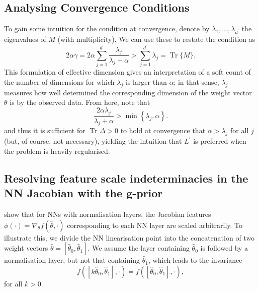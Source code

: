 \subsection{Analysing Convergence Conditions}
\label{app:large_regulariser_derivation}

To gain some intuition for the condition at convergence, denote by $\lambda_1, \ldots, \lambda_{d^{\prime}}$ the eigenvalues of $M$ (with multiplicity). We can use these to restate the condition as
\begin{equation}
    2 \alpha \gamma=2 \alpha \sum_{j=1}^{d^{\prime}} \frac{\lambda_j}{\lambda_j+\alpha}>\sum_{j=1}^{d^{\prime}} \lambda_j=\operatorname{Tr}\{M\}.
\end{equation}
This formulation of effective dimension gives an interpretation of a soft count of the number of dimensions for which $\lambda_j$ is larger than $\alpha$; in that sense, $\lambda_j$ measures how well determined the corresponding dimension of the weight vector $\theta$ is by the observed data. From here, note that
\begin{equation}
    \frac{2 \alpha \lambda_j}{\lambda_j+\alpha}>\min \left\{\lambda_j, \alpha\right\}.
\end{equation}
and thus it is sufficient for $\operatorname{Tr} \Delta>0$ to hold at convergence that $\alpha>\lambda_j$ for all $j$ (but, of course, not necessary), yielding the intuition that $L^{\prime}$ is preferred when the problem is heavily regularised.

\subsection{Resolving feature scale indeterminacies in the NN Jacobian with the g-prior}\label{app:g-prior-scale-solution}

\textcite{antoran2022linearised} show that for NNs with normalisation layers, the Jacobian features $\phi(\cdot) = \nabla_{\theta}f(\hat{\theta}, \cdot)$ corresponding to each NN layer are scaled arbitrarily. To illustrate this, we divide the NN linearisation point into the concatenation of two weight vectors $\hat{\theta} = [\hat{\theta}_{0}, \hat{\theta}_{1}]$. We assume the layer containing $\hat{\theta}_{0}$ is followed by a normalisation layer, but not that containing $\hat{\theta}_{1}$, which leads to the invariance 
\begin{equation}
    f([k \hat{\theta}_{0}, \hat{\theta}_{1}], \cdot) = f([\hat{\theta}_{0}, \hat{\theta}_{1}], \cdot),
\end{equation}
for all $k>0$.

